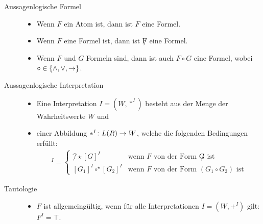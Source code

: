 \documentclass[a4paper, 11pt, ngerman]{scrartcl}
\begin{document}

\vspace{12pt}


\begin{description}
\item[Aussagenlogische Formel]
\begin{itemize}
	\item Wenn $F$ ein Atom ist, dann ist $F$ eine Formel.
	\item Wenn $F$ eine Formel ist, dann ist $\not F$ eine Formel.
	\item Wenn $F$ und $G$ Formeln sind, dann ist auch $F \circ G$ eine Formel, wobei $\circ \in \{ \land, \lor, \rightarrow \}$.
\end{itemize}

\item[Aussagenlogische Interpretation]
\begin{itemize}
	\item Eine Interpretation $I = (W, *^{I})$ besteht aus der Menge der Wahrheitswerte $W$ und 
	\item einer Abbildung $*^{I} \colon L(R) \to W$, welche die folgenden Bedingungen erfüllt:
	\begin{align*}
	[F]^I = \begin{cases}
	\not^{\star} [G]^I & \text{wenn $F$ von der Form $\not G$ ist} \\
	[G_1]^I \circ^{\star} [G_2]^I & \text{wenn $F$ von der Form $(G_1 \circ G_2)$ ist}
	\end{cases}
	\end{align*}
\end{itemize}

\item[Tautologie]
\begin{itemize}
	\item $F$ ist allgemeingültig, wenn für alle Interpretationen $I=(W,+^I)$ gilt: $F^I = \top$.
\end{itemize}


\end{description}
\end{document}
